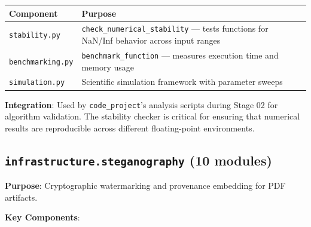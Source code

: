 \documentclass[
]{article}
\newcounter{none} %
\begin{document}
{\def\LTcaptype{none} %
\begin{longtable}[]{@{}
  >{\raggedright\arraybackslash}p{}
  >{\raggedright\arraybackslash}p{}@{}}
\toprule\noalign{}
\begin{minipage}[b]{\linewidth}\raggedright
Component
\end{minipage} & \begin{minipage}[b]{\linewidth}\raggedright
Purpose
\end{minipage} \\
\midrule\noalign{}
\endhead
\bottomrule\noalign{}
\endlastfoot
\texttt{stability.py} & \texttt{check\_numerical\_stability} --- tests
functions for NaN/Inf behavior across input ranges \\
\texttt{benchmarking.py} & \texttt{benchmark\_function} --- measures
execution time and memory usage \\
\texttt{simulation.py} & Scientific simulation framework with parameter
sweeps \\
\end{longtable}
}

\textbf{Integration}: Used by \texttt{code\_project}'s analysis scripts
during Stage 02 for algorithm validation. The stability checker is
critical for ensuring that numerical results are reproducible across
different floating-point environments.

\subsection{\texorpdfstring{\texttt{infrastructure.steganography} (10
modules)}{infrastructure.steganography (10 modules)}}\label{infrastructure.steganography-10-modules}

\textbf{Purpose}: Cryptographic watermarking and provenance embedding
for PDF artifacts.

\textbf{Key Components}:
\end{document}
